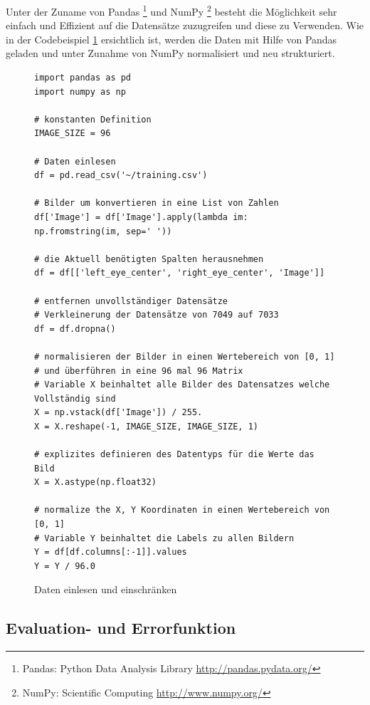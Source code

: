 \noindent
Unter der Zuname von Pandas \footnote{Pandas: Python Data Analysis Library \url{http://pandas.pydata.org/}} und NumPy \footnote{NumPy: Scientific Computing \url{http://www.numpy.org/}} besteht die Möglichkeit sehr einfach und Effizient auf die Datensätze zuzugreifen und diese zu Verwenden. 
Wie in der Codebeispiel \ref{fig:datenLesenEinschränken} ersichtlich ist, werden die Daten mit Hilfe von Pandas geladen und unter Zunahme von NumPy normalisiert und neu strukturiert. 
\begin{figure}[ht!]
\lstset{language=Python}
\begin{lstlisting}
import pandas as pd
import numpy as np

# konstanten Definition
IMAGE_SIZE = 96

# Daten einlesen
df = pd.read_csv('~/training.csv')

# Bilder um konvertieren in eine List von Zahlen
df['Image'] = df['Image'].apply(lambda im: np.fromstring(im, sep=' '))

# die Aktuell benötigten Spalten herausnehmen
df = df[['left_eye_center', 'right_eye_center', 'Image']]

# entfernen unvollständiger Datensätze
# Verkleinerung der Datensätze von 7049 auf 7033
df = df.dropna()

# normalisieren der Bilder in einen Wertebereich von [0, 1] 
# und überführen in eine 96 mal 96 Matrix
# Variable X beinhaltet alle Bilder des Datensatzes welche Vollständig sind
X = np.vstack(df['Image']) / 255.
X = X.reshape(-1, IMAGE_SIZE, IMAGE_SIZE, 1)

# explizites definieren des Datentyps für die Werte das Bild
X = X.astype(np.float32)

# normalize the X, Y Koordinaten in einen Wertebereich von [0, 1]
# Variable Y beinhaltet die Labels zu allen Bildern
Y = df[df.columns[:-1]].values
Y = Y / 96.0
\end{lstlisting}
	\caption{Daten einlesen und einschränken}
	\label{fig:datenLesenEinschränken}
\end{figure}

\subsection{Evaluation- und Errorfunktion}

